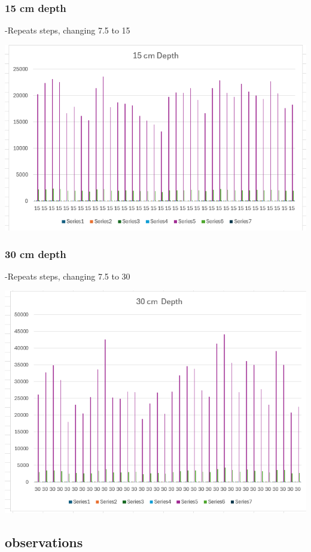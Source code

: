 \documentclass[
  letterpaper,
  DIV=11,
  numbers=noendperiod]{scrreprt}
\begin{document}
\subsubsection{15 cm depth}\label{cm-depth-1}

-Repeats steps, changing 7.5 to 15

\includegraphics{./Excel_1_Unit/Week1_Diego/Week_1DJ/screenshots/Soil2.png}

\subsubsection{30 cm depth}\label{cm-depth-2}

-Repeats steps, changing 7.5 to 30

\includegraphics{./Excel_1_Unit/Week1_Diego/Week_1DJ/screenshots/Soil3.png}

\subsection{observations}\label{observations-3}
\end{document}

